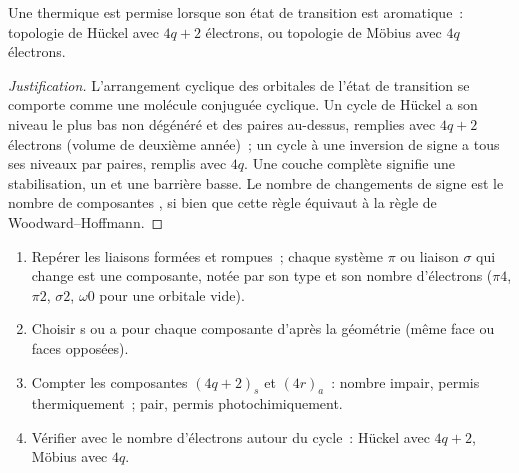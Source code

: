 \begin{proposition}\label{prop:b3:pericyclic:aromatic-ts}
Une  thermique est permise lorsque son état de transition est aromatique~:
topologie de Hückel avec $4q + 2$ électrons, ou topologie de Möbius avec $4q$ électrons.
\end{proposition}

\begin{proof}[Justification]
L'arrangement cyclique des orbitales de l'état de transition se comporte
comme une molécule conjuguée cyclique. Un cycle de Hückel a son niveau le
plus bas non dégénéré et des paires au-dessus, remplies avec $4q + 2$ électrons (volume de deuxième année)~; un cycle à une
inversion de signe a tous ses niveaux par paires, remplis avec $4q$. Une couche complète signifie une
stabilisation, un  et une barrière basse. Le
nombre de changements de signe est le nombre de composantes ,
si bien que cette règle équivaut à la règle de Woodward--Hoffmann.
\end{proof}

\begin{method}\label{met:b3:pericyclic:components}
\begin{enumerate}
  \item Repérer les liaisons formées et rompues~; chaque système $\pi$ ou liaison $\sigma$ qui change est une
        composante, notée par son type et son nombre d'électrons ($\pi4$, $\pi2$, $\sigma2$, $\omega0$ pour
        une orbitale vide).
  \item Choisir s ou a pour chaque composante d'après la géométrie (même
        face ou faces opposées).
  \item Compter les composantes $(4q + 2)_s$ et $(4r)_a$~: nombre impair, permis thermiquement~; pair, permis
        photochimiquement.
  \item Vérifier avec le nombre d'électrons autour du cycle~: Hückel avec $4q + 2$,
        Möbius avec $4q$.
\end{enumerate}
\end{method}

